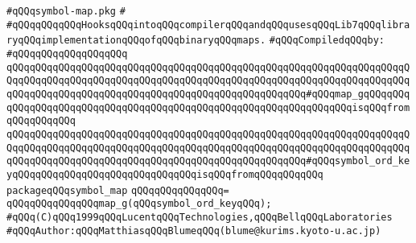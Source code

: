 \label{src/app/makelib/stuff/symbol-map.pkg}
\verb|#qQQqsymbol-map.pkg|\newline
\verb|#|\newline
\verb|#qQQqqQQqqQQqHooksqQQqintoqQQqcompilerqQQqandqQQqusesqQQqLib7qQQqlibraryqQQqimplementationqQQqofqQQqbinaryqQQqmaps.|\newline
\newline
\verb|#qQQqCompiledqQQqby:|\newline
\verb|#qQQqqQQqqQQqqQQqqQQq|\newline
\newline
\verb|qQQqqQQqqQQqqQQqqQQqqQQqqQQqqQQqqQQqqQQqqQQqqQQqqQQqqQQqqQQqqQQqqQQqqQQqqQQqqQQqqQQqqQQqqQQqqQQqqQQqqQQqqQQqqQQqqQQqqQQqqQQqqQQqqQQqqQQqqQQqqQQqqQQqqQQqqQQqqQQqqQQqqQQqqQQqqQQqqQQqqQQqqQQqqQQq#qQQqmap_gqQQqqQQqqQQqqQQqqQQqqQQqqQQqqQQqqQQqqQQqqQQqqQQqqQQqqQQqqQQqqQQqqQQqisqQQqfromqQQqqQQqqQQq|\newline
\verb|qQQqqQQqqQQqqQQqqQQqqQQqqQQqqQQqqQQqqQQqqQQqqQQqqQQqqQQqqQQqqQQqqQQqqQQqqQQqqQQqqQQqqQQqqQQqqQQqqQQqqQQqqQQqqQQqqQQqqQQqqQQqqQQqqQQqqQQqqQQqqQQqqQQqqQQqqQQqqQQqqQQqqQQqqQQqqQQqqQQqqQQqqQQqqQQq#qQQqsymbol_ord_keyqQQqqQQqqQQqqQQqqQQqqQQqqQQqqQQqisqQQqfromqQQqqQQqqQQq|\newline
\newline
\verb|packageqQQqsymbol_map|\newline
\verb|qQQqqQQqqQQqqQQq=|\newline
\verb|qQQqqQQqqQQqqQQqmap_g(qQQqsymbol_ord_keyqQQq);|\newline
\newline
\newline
\newline
\verb|#qQQq(C)qQQq1999qQQqLucentqQQqTechnologies,qQQqBellqQQqLaboratories|\newline
\verb|#qQQqAuthor:qQQqMatthiasqQQqBlumeqQQq(blume@kurims.kyoto-u.ac.jp)|\newline

